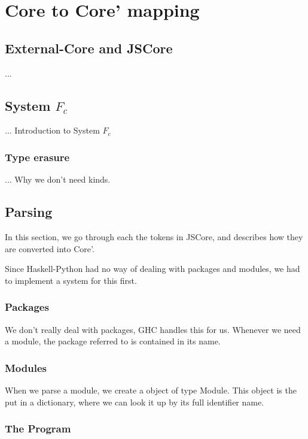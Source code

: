 

\chapter{Core to Core' mapping}
\label{chap:rewrite}

\section{External-Core and JSCore}

...

\section{System $F_c$}

... Introduction to System $F_c$

\cite{sulzmann2007system}


\subsection{Type erasure}

... Why we don't need kinds.


\section{Parsing}

In this section, we go through each the tokens in JSCore, and describes
how they are converted into Core'.

Since Haskell-Python had no way of dealing with packages and modules, 
we had to implement a system for this first.

\subsection{Packages}

We don't really deal with packages, GHC handles this for us. Whenever we
need a module, the package referred to is contained in its name.

\subsection{Modules}

When we parse a module, we create a object of type Module. This object is
the put in a dictionary, where we can look it up by its full identifier name.

\subsection{The Program}


